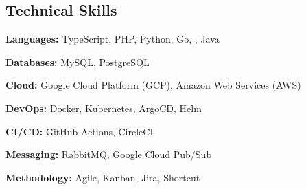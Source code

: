 \documentclass[11pt, letterpaper]{article}
\begin{document}
\subsection*{Technical Skills}

\begin{itemize*}
  \item \textbf{Languages:} TypeScript, PHP, Python, Go, \CPP, Java
  \item \textbf{Databases:} MySQL, PostgreSQL
  \item \textbf{Cloud:} Google Cloud Platform (GCP), Amazon Web Services (AWS)
  \item \textbf{DevOps:} Docker, Kubernetes, ArgoCD, Helm
  \item \textbf{CI/CD:} GitHub Actions, CircleCI
  \item \textbf{Messaging:} RabbitMQ, Google Cloud Pub/Sub
  \item \textbf{Methodology:} Agile, Kanban, Jira, Shortcut
\end{itemize*}
\end{document}
